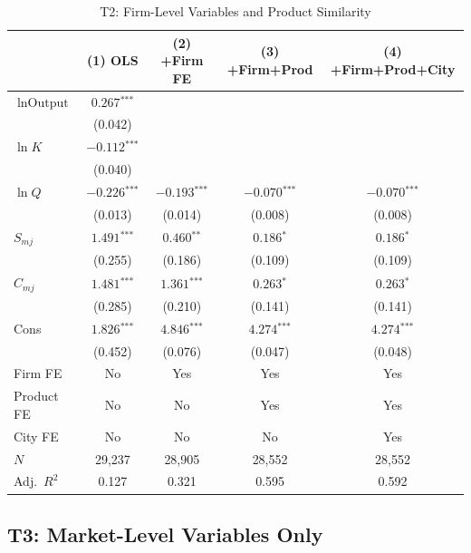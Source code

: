 \documentclass[12pt]{article}
\newcommand{\sym}[1]{\ensuremath{^{\text{#1}}}}
\newcommand{\se}[1]{{\small(#1)}}
\newcommand{\abs}{\textemdash}
\begin{document}
\begin{table}[H]
  \centering
  \caption{T2: Firm-Level Variables and Product Similarity}
  \label{tab:t2}
  \begin{threeparttable}
    \begin{tabular}{lcccc}
      \toprule
      & (1) OLS & (2) +Firm FE & (3) +Firm+Prod & (4) +Firm+Prod+City \\
      \midrule
      \(\ln \text{Output}\) & \(0.267\sym{***}\) & \abs & \abs & \abs \\
                             & \se{0.042} & & & \\[4pt]
      \(\ln K\) & \(-0.112\sym{***}\) & \abs & \abs & \abs \\
                & \se{0.040} & & & \\[4pt]
      \(\ln Q\) & \(-0.226\sym{***}\) & \(-0.193\sym{***}\) & \(-0.070\sym{***}\) & \(-0.070\sym{***}\) \\
                & \se{0.013} & \se{0.014} & \se{0.008} & \se{0.008} \\[4pt]
      \(S_{mj}\) & \(1.491\sym{***}\) & \(0.460\sym{**}\) & \(0.186\sym{*}\) & \(0.186\sym{*}\) \\
                 & \se{0.255} & \se{0.186} & \se{0.109} & \se{0.109} \\[4pt]
      \(C_{mj}\) & \(1.481\sym{***}\) & \(1.361\sym{***}\) & \(0.263\sym{*}\) & \(0.263\sym{*}\) \\
                 & \se{0.285} & \se{0.210} & \se{0.141} & \se{0.141} \\[4pt]
      Cons & \(1.826\sym{***}\) & \(4.846\sym{***}\) & \(4.274\sym{***}\) & \(4.274\sym{***}\) \\
               & \se{0.452} & \se{0.076} & \se{0.047} & \se{0.048} \\
      \midrule
      Firm FE    & No  & Yes & Yes & Yes \\
      Product FE & No  & No  & Yes & Yes \\
      City FE    & No  & No  & No  & Yes \\
      \(N\)      & 29,237 & 28,905 & 28,552 & 28,552 \\
      Adj.\ \(R^2\) & 0.127 & 0.321 & 0.595 & 0.592 \\
      \bottomrule
    \end{tabular}
  \end{threeparttable}
\end{table}

\subsection{T3: Market-Level Variables Only}
\label{sec:t3}
\end{document}
